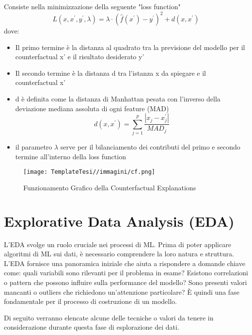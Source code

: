\begin{flushleft}
\begin{itemize}
    
    Consiste nella minimizzazione della seguente "loss function"
    $$L(x,x^\prime,y^\prime,\lambda)=\lambda\cdot(\hat{f}(x^\prime)-y^\prime)^2+d(x,x^\prime)$$
    dove:
    \begin{itemize}
        \item Il primo termine è la distanza al quadrato tra la previsione del modello per il counterfactual x' e il risultato desiderato y'
        \item  Il secondo termine è la distanza d tra l'istanza x da spiegare e il counterfactual x'
        \item d è definita come la distanza di Manhattan pesata con l'inverso della deviazione mediana assoluta di ogni feature (MAD)
        $$d(x,x^\prime)=\sum_{j=1}^p\frac{|x_j-x^\prime_j|}{MAD_j}$$

        \item il parametro \( \lambda \)  serve per il bilanciamento dei contributi del primo e secondo termine all'interno della loss function 
    \end{itemize}
    
\end{itemize}
\begin{figure}[H]
    \centering
    \texttt{[image: TemplateTesi//immagini/cf.png]}
    \caption{Funzionamento Grafico della Counterfactual Explanations \cite{immcf}}
    \label{fig:counterfactual}
\end{figure}


\section{Explorative Data Analysis (EDA)}
L'EDA svolge un ruolo cruciale nei processi di ML. Prima di poter applicare algoritmi di ML sui dati, è necessario comprendere la loro natura e struttura. 
L'EDA fornisce una panoramica iniziale che aiuta a rispondere a domande chiave come: quali variabili sono rilevanti per il problema in esame? Esistono correlazioni o pattern che possono influire sulla performance del modello? Sono presenti valori mancanti o outliers che richiedono un'attenzione particolare?
È quindi una fase fondamentale per il processo di costruzione di un modello.

Di seguito verranno elencate alcune delle tecniche o valori da tenere in considerazione durante questa fase di esplorazione dei dati.

\end{flushleft}
